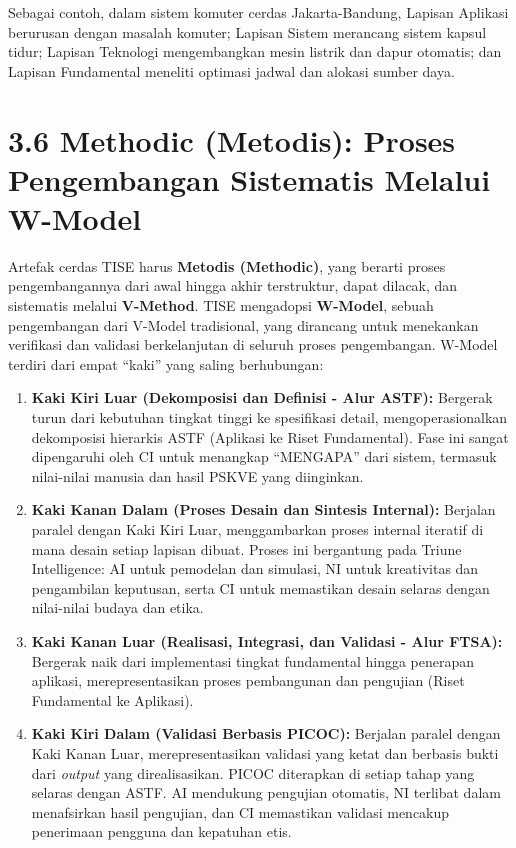 \documentclass[
  letterpaper,
  DIV=11,
  numbers=noendperiod]{scrreprt}
\providecommand{\tightlist}{%
  \setlength{\itemsep}{0pt}\setlength{\parskip}{0pt}}
\begin{document}
Sebagai contoh, dalam sistem komuter cerdas Jakarta-Bandung, Lapisan
Aplikasi berurusan dengan masalah komuter; Lapisan Sistem merancang
sistem kapsul tidur; Lapisan Teknologi mengembangkan mesin listrik dan
dapur otomatis; dan Lapisan Fundamental meneliti optimasi jadwal dan
alokasi sumber daya.

\section{\texorpdfstring{\textbf{3.6 Methodic (Metodis): Proses
Pengembangan Sistematis Melalui
W-Model}}{3.6 Methodic (Metodis): Proses Pengembangan Sistematis Melalui W-Model}}\label{methodic-metodis-proses-pengembangan-sistematis-melalui-w-model}

Artefak cerdas TISE harus \textbf{Metodis (Methodic)}, yang berarti
proses pengembangannya dari awal hingga akhir terstruktur, dapat
dilacak, dan sistematis melalui \textbf{V-Method}. TISE mengadopsi
\textbf{W-Model}, sebuah pengembangan dari V-Model tradisional, yang
dirancang untuk menekankan verifikasi dan validasi berkelanjutan di
seluruh proses pengembangan. W-Model terdiri dari empat ``kaki'' yang
saling berhubungan:

\begin{enumerate}
\def\labelenumi{\arabic{enumi}.}
\tightlist
\item
  \textbf{Kaki Kiri Luar (Dekomposisi dan Definisi - Alur ASTF):}
  Bergerak turun dari kebutuhan tingkat tinggi ke spesifikasi detail,
  mengoperasionalkan dekomposisi hierarkis ASTF (Aplikasi ke Riset
  Fundamental). Fase ini sangat dipengaruhi oleh CI untuk menangkap
  ``MENGAPA'' dari sistem, termasuk nilai-nilai manusia dan hasil PSKVE
  yang diinginkan.
\item
  \textbf{Kaki Kanan Dalam (Proses Desain dan Sintesis Internal):}
  Berjalan paralel dengan Kaki Kiri Luar, menggambarkan proses internal
  iteratif di mana desain setiap lapisan dibuat. Proses ini bergantung
  pada Triune Intelligence: AI untuk pemodelan dan simulasi, NI untuk
  kreativitas dan pengambilan keputusan, serta CI untuk memastikan
  desain selaras dengan nilai-nilai budaya dan etika.
\item
  \textbf{Kaki Kanan Luar (Realisasi, Integrasi, dan Validasi - Alur
  FTSA):} Bergerak naik dari implementasi tingkat fundamental hingga
  penerapan aplikasi, merepresentasikan proses pembangunan dan pengujian
  (Riset Fundamental ke Aplikasi).
\item
  \textbf{Kaki Kiri Dalam (Validasi Berbasis PICOC):} Berjalan paralel
  dengan Kaki Kanan Luar, merepresentasikan validasi yang ketat dan
  berbasis bukti dari \emph{output} yang direalisasikan. PICOC
  diterapkan di setiap tahap yang selaras dengan ASTF. AI mendukung
  pengujian otomatis, NI terlibat dalam menafsirkan hasil pengujian, dan
  CI memastikan validasi mencakup penerimaan pengguna dan kepatuhan
  etis.
\end{enumerate}
\end{document}
